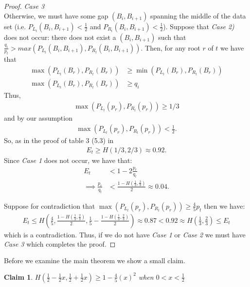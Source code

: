 \documentclass[letterpaper,12pt,titlepage,oneside,final]{book}
\theoremstyle{plain}
\begin{document}
\begin{proof}
\noindent\textit{Case 3} \\
Otherwise, we must have some gap $(B_i, B_{i+1})$ spanning the middle of the data set (i.e. $P_{L_t}(B_i, B_{i+1}) < \frac{1}{2}$ and $P_{R_t}(B_i, B_{i+1}) < \frac{1}{2}$). Suppose that \textit{Case 2)} does not occur: there does not exist a $(B_i, B_{i+1})$ such that $\frac{q_i}{p_t} > max(P_{L_t}(B_i, B_{i+1}), P_{R_t}(B_i, B_{i+1}))$. Then, for any root $r$ of $t$ we have that \\
\begin{align*}
\max(P_{L_t}(B_r), P_{R_t}(B_r)) &\geq \min(P_{L_t}(B_r), P_{R_t}(B_r))\\ 
\max(P_{L_t}(B_r), P_{R_t}(B_r)) &\geq q_i
\end{align*}
Thus,
\begin{align*}
\max(P_{L_t}(p_r), P_{R_t}(p_r)) \geq 1/3
\end{align*}
 and by our assumption 
\begin{align*}
\max(P_{L_t}(p_r), P_{R_t}(p_r)) < \frac{1}{2}.
\end{align*}
 So, as in the proof of table 3 (5.3) in \cite{guttler1980binary}\\
\begin{align*}
E_t \geq H(1/3, 2/3) \approx 0.92.
\end{align*}
 Since \textit{Case 1} does not occur, we have that:
\begin{align*}
E_t &< 1-2\frac{p_r}{q_t} \\
\implies \frac{p_r}{q_t} &< \frac{1-H(\frac{1}{3}, \frac{2}{3})}{2} \approx 0.04.
\end{align*}

Suppose for contradiction that $\max(P_{L_t}(p_r), P_{R_t}(p_r)) \geq \frac{4}{5} p_t$ then we have:
\begin{align*}
E_t \leq H(\frac{4}{5}, \frac{1-H(\frac{1}{3}, \frac{2}{3})}{2}, \frac{1}{5}-\frac{1-H(\frac{1}{3}, \frac{2}{3})}{2}) \approx 0.87 < 0.92 \approx H(\frac{1}{3}, \frac{2}{3}) \leq E_t
\end{align*}
which is a contradiction.
Thus, if we do not have \textit{Case 1} or \textit{Case 2} we must have \textit{Case 3} which completes the proof.



\end{proof}

Before we examine the main theorem we show a small claim.

\newtheorem{claim}{Claim}
\begin{claim}\label{Claim1}
$H(\frac{1}{2}-\frac{1}{2} x, \frac{1}{2} + \frac{1}{2} x) \geq 1- \frac{4}{5} (x)^2$ when $0 < x < \frac{1}{2}$
\end{claim}
\end{document}
